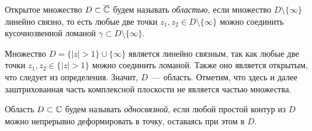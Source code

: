 \begin{definition}
Открытое множество \(D \subset \overline{\mathbb{C}}\) будем называть \textit{областью}, если множество \(D \setminus
\{\infty\}\) линейно связно, то есть любые две точки \(z_1, z_2 \in D \setminus \{\infty\}\) можно
соединить кусочнозвенной ломаной \(\gamma \subset D \setminus \{\infty\}\).
\end{definition}

\begin{example}
\hfill \noindent
\par
\begin{minipage}[c]{0.45\textwidth}
    \centering
\end{minipage}
\hfill
\begin{minipage}[c]{0.5\textwidth}
Множество \(D = \{|z| > 1\} \cup \{\infty\}\) является линейно связным, так как любые две точки 
\(z_1, z_2 \in \{|z| > 1\}\) можно соединить ломаной. Также оно является открытым, что следует из 
определения. Значит, \(D\)~--- область. Отметим, что здесь и далее заштрихованная часть комплексной 
плоскости не является частью множества.
\end{minipage}
\end{example}

\begin{definition}
Область \(D \subset \mathbb{C}\) будем называть \textit{односвязной}, если любой простой контур из \(D\)
можно непрерывно деформировать в точку, оставаясь при этом в \(D\).
\end{definition}

